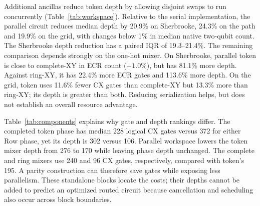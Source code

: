\documentclass[manuscript,screen,review]{acmart}
\begin{document}
\begin{table}[t]\centering\small\setlength{\tabcolsep}{3pt}
\caption{Full-circuit resource comparison: medians and
interquartile ranges of paired percentage changes after five-seed instance
medians ($N=12$). All methods use $p=3$; token uses L1 completion
and Gray synthesis. Circuits are identical across targets before routing.
Positive changes are more costly. The native two-qubit gate is ECR on
Sherbrooke and CX on the synthetic line25/grid25 targets.}
\label{tab:workspace}
\end{table}

Additional ancillas reduce token depth by allowing disjoint swaps to run
concurrently (Table~\ref{tab:workspace}). Relative to the serial implementation, the parallel circuit
reduces median depth by 20.9\% on Sherbrooke, 24.3\% on the path and 19.9\%
on the grid, with changes below 1\% in median native two-qubit count.
The Sherbrooke depth reduction has a paired IQR of 19.3--21.4\%.
The remaining comparison depends strongly on the one-hot mixer. On
Sherbrooke, parallel token is close to complete-XY in ECR count
($+1.0\%$), but has 81.1\% more depth. Against ring-XY, it has 22.4\%
more ECR gates and 113.6\% more depth. On the grid, token uses 11.6\%
fewer CX gates than complete-XY but 13.3\% more than ring-XY; its depth
is greater than both. Reducing serialization helps, but does not establish
an overall resource advantage.

\begin{table}[t]\centering\small\setlength{\tabcolsep}{3pt}
\caption{Standalone component accounting on the same 12 cases: median logical
counts in the \texttt{rz,sx,x,cx} basis. Preparation initializes the deterministic
placement; mixer is the first ordered layer; phase is one distance/penalty layer.
Data and Anc. are reserved logical widths, including qubits idle in a
standalone block; ancillas are clean workspace. $R_Z$ is a subset of 1q gates.
Standalone counts are not additive estimates of an optimized full circuit;
cross-component cancellation and routing change the total. Routed component
medians and IQRs for all three targets are in the artifact.}
\label{tab:components}
\end{table}

Table~\ref{tab:components} explains why gate and depth rankings differ. The
completed token phase has median 228 logical CX gates versus 372 for either
Row phase, yet its depth is 302 versus 106. Parallel workspace lowers the
token mixer depth from 276 to 170 while leaving phase depth unchanged.
The complete and ring mixers use 240 and 96 CX gates, respectively,
compared with token's 195. A parity construction can therefore save gates
while exposing less parallelism. These standalone blocks locate the costs;
their depths cannot be added to predict an optimized routed circuit because
cancellation and scheduling also occur across block boundaries.
\end{document}
